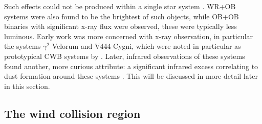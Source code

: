 \noindent
Such effects could not be produced within a single star system \parencite[34]{pittard_x-ray_1999}.
WR+OB systems were also found to be the brightest of such objects, while OB+OB binaries with significant x-ray flux were observed, these were typically less luminous.
Early work was more concerned with x-ray observation, in particular the systems $\gamma^2$ Velorum and V444 Cygni, which were noted in particular as prototypical CWB systems by \textcite{prilutskii_x_1976}.
Later, infrared observations of these systems found another, more curious attribute: a significant infrared excess correlating to dust formation around these systems \parencite{williamsInfraredPhotometryLatetype1987}.
This will be discussed in more detail later in this section.

\subsection{The wind collision region}
\label{sec:wcr}

